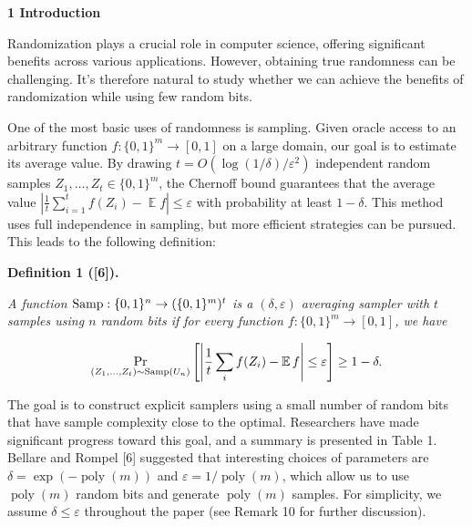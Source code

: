 

\par\medskip\noindent\textbf{
1 Introduction}\par




Randomization plays a crucial role in computer science, offering significant benefits across various applications. However, obtaining true randomness can be challenging.
It’s therefore natural to study whether we can achieve the benefits of randomization while using few random bits.\par




One of the most basic uses of randomness is sampling.
Given oracle access to an arbitrary function $f:\{0,1\}^{m}\to[0,1]$ on a large domain, our goal is to estimate its average value.
By drawing $t=O(\log(1/\delta)/\varepsilon^{2})$ independent random samples $Z_{1},\dots,Z_{t}\in\{0,1\}^{m}$,
the Chernoff bound guarantees that the average value $\left|\frac{1}{t}\sum_{i=1}^{t}f(Z_{i})-\operatorname*{\mathbb{E}}f\right|\leq\varepsilon$ with probability at least $1-\delta$. This method uses full independence in sampling, but more efficient strategies can be pursued. This leads to the following definition:\par





\par\medskip\noindent\textbf{
\textbf{Definition 1}\textbf{ }([6])\textbf{.}
}\par



\emph{A function $\textup{{Samp}}:\{0,1\}^{n}\to(\{0,1\}^{m})^{t}$ is a $(\delta,\varepsilon)$ averaging sampler with $t$ samples using $n$ random bits if for every function $f:\{0,1\}^{m}\to[0,1]$, we have}\par


\[\begin{gathered}
\Pr_{(Z_{1},\dots,Z_{t})\sim\textup{{Samp}}(U_{n})}\left[\left|\frac{1}{t}\sum_{i}f(Z_{i})-\operatorname*{\mathbb{E}}f\right|\leq\varepsilon\right]\geq 1-\delta.
\end{gathered}\]






The goal is to construct explicit samplers using a small number of random bits that have sample complexity close to the optimal. Researchers have made significant progress toward this goal, and a summary is presented in Table 1.
Bellare and Rompel [6] suggested that interesting choices of parameters are $\delta=\exp(-\operatorname*{poly}(m))$ and $\varepsilon=1/\operatorname*{poly}(m)$, which allow us to use $\operatorname*{poly}(m)$ random bits and generate $\operatorname*{poly}(m)$ samples.
For simplicity, we assume $\delta\leq\varepsilon$ throughout the paper (see Remark 10 for further discussion).\par



